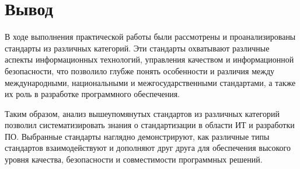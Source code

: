 \section*{\LARGE Вывод}

В ходе выполнения практической работы были рассмотрены
и проанализированы стандарты из различных категорий.
Эти стандарты охватывают различные аспекты информационных технологий,
управления качеством и информационной безопасности,
что позволило глубже понять особенности и различия между международными,
национальными и межгосударственными стандартами,
а также их роль в разработке программного обеспечения.

Таким образом, анализ вышеупомянутых стандартов
из различных категорий позволил систематизировать знания о стандартизации
в области ИТ и разработки ПО. Выбранные стандарты наглядно демонстрируют,
как различные типы стандартов взаимодействуют
и дополняют друг друга для обеспечения высокого уровня качества,
безопасности и совместимости программных решений.
